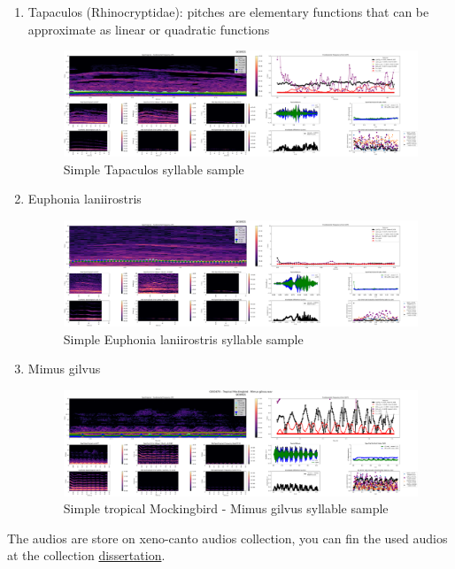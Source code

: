 \begin{enumerate}
    \item Tapaculos (Rhinocryptidae): pitches are elementary functions that can be approximate as linear or quadratic functions 
    
    \begin{figure}[H]
    \centering
    \includegraphics[width=1\linewidth]{Images/ScoresVariables-syllable-XC104508 - Ocellated Tapaculo - Acropternis orthonyx.wav-0.png}
    \caption{Simple Tapaculos syllable sample}
    \label{fig:tapaculos}
    \end{figure}
    
    
    \item Euphonia laniirostris 
    \begin{figure}[H]
    \centering
    \includegraphics[width=1\linewidth]{Images/ScoresVariables-syllable-C527995 - Thick-billed Euphonia - Euphonia laniirostris.wav-0.png}
    \caption{Simple Euphonia laniirostris syllable sample}
    \label{fig:tapaculos}
    \end{figure}
    
    \item Mimus gilvus
    \begin{figure}[H]
    \centering
    \includegraphics[width=1\linewidth]{Images/ScoresVariables-syllable-C693679 - Tropical Mockingbird - Mimus gilvus.wav-0.png}
    \caption{Simple tropical Mockingbird - Mimus gilvus syllable sample}
    \label{fig:mimus}
    \end{figure}

    
\end{enumerate}

The audios are store on xeno-canto audios collection, you can fin the used audios at the collection \href{https://xeno-canto.org/set/8103}{dissertation}.